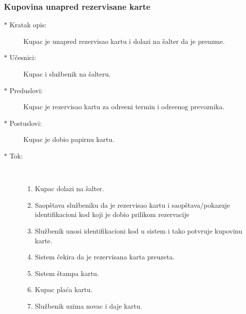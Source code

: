 \subsubsection{Kupovina unapred rezervisane karte}
\begin{description}
	\item[$\ast$ Kratak opis: ] Kupac je unapred rezervisao kartu i dolazi na \v salter da je preuzme.
	\item[$\ast$ U\v cesnici: ] Kupac i slu\v zbenik na \v salteru.
	\item[$\ast$ Preduslovi: ] Kupac je rezervisao kartu za odre\dj{}eni termin i odre\dj{}enog prevoznika.
	\item[$\ast$ Postuslovi: ] Kupac je dobio papirnu kartu.
	\item[$\ast$ Tok: ] \ \\
	\begin{enumerate}
		\item Kupac dolazi na \v salter.
		\item Saop\v stava slu\v zbeniku da je rezervisao kartu i saop\v stava/pokazuje identifikacioni kod koji je dobio prilikom rezervacije
		\item Slu\v zbenik unosi identifikacioni kod u sistem i tako potvr\dj{}uje kupovinu karte.
		\item Sistem \v cekira da je rezervisana karta preuzeta.
		\item Sistem \v stampa kartu.
		\item Kupac pla\'ca kartu.
		\item Slu\v zbenik uzima novac i daje kartu.
	\end{enumerate}
\end{description}

